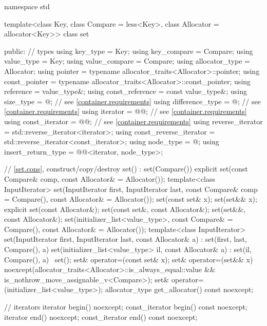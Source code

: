 \begin{codeblock}
namespace std {
  template<class Key, class Compare = less<Key>,
           class Allocator = allocator<Key>>
  class set {
  public:
    // types
    using key_type               = Key;
    using key_compare            = Compare;
    using value_type             = Key;
    using value_compare          = Compare;
    using allocator_type         = Allocator;
    using pointer                = typename allocator_traits<Allocator>::pointer;
    using const_pointer          = typename allocator_traits<Allocator>::const_pointer;
    using reference              = value_type&;
    using const_reference        = const value_type&;
    using size_type              = @\impdef@; // see \ref{container.requirements}
    using difference_type        = @\impdef@; // see \ref{container.requirements}
    using iterator               = @@; // see \ref{container.requirements}
    using const_iterator         = @@; // see \ref{container.requirements}
    using reverse_iterator       = std::reverse_iterator<iterator>;
    using const_reverse_iterator = std::reverse_iterator<const_iterator>;
    using node_type              = @\unspec@;
    using insert_return_type     = @@<iterator, node_type>;

    // \ref{set.cons}, construct/copy/destroy
    set() : set(Compare()) { }
    explicit set(const Compare& comp, const Allocator& = Allocator());
    template<class InputIterator>
      set(InputIterator first, InputIterator last,
          const Compare& comp = Compare(), const Allocator& = Allocator());
    set(const set& x);
    set(set&& x);
    explicit set(const Allocator&);
    set(const set&, const Allocator&);
    set(set&&, const Allocator&);
    set(initializer_list<value_type>, const Compare& = Compare(),
        const Allocator& = Allocator());
    template<class InputIterator>
      set(InputIterator first, InputIterator last, const Allocator& a)
        : set(first, last, Compare(), a) { }
    set(initializer_list<value_type> il, const Allocator& a)
      : set(il, Compare(), a) { }
    ~set();
    set& operator=(const set& x);
    set& operator=(set&& x)
      noexcept(allocator_traits<Allocator>::is_always_equal::value &&
               is_nothrow_move_assignable_v<Compare>);
    set& operator=(initializer_list<value_type>);
    allocator_type get_allocator() const noexcept;

    // iterators
    iterator               begin() noexcept;
    const_iterator         begin() const noexcept;
    iterator               end() noexcept;
    const_iterator         end() const noexcept;

}}
\end{codeblock}
